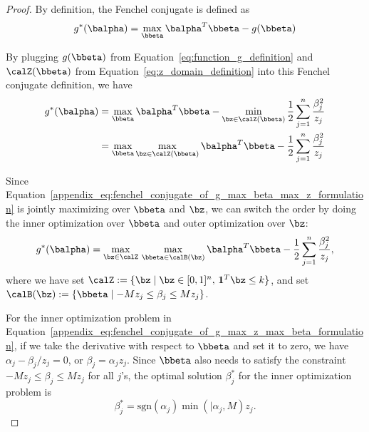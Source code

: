 \begin{proof}

    By definition, the Fenchel conjugate is defined as
    \begin{equation}
        \label{appendix_def:fenchel_conjugate_of_g}
        g^*(\balpha) = \max_{\bbeta} \balpha^T \bbeta - g(\bbeta)
    \end{equation}

    By plugging $g(\bbeta)$ from Equation~\eqref{eq:function_g_definition} and $\calZ(\bbeta)$ from Equation~\eqref{eq:z_domain_definition} into this Fenchel conjugate definition, we have
    \begin{align}
        \label{appendix_eq:fenchel_conjugate_of_g_max_beta_max_z_formulation}
            g^*(\balpha) &= \max_{\bbeta} \balpha^T \bbeta - \min_{\bz \in \calZ(\bbeta)} \frac{1}{2} \sum_{j=1}^n \frac{\beta_j^2}{z_j} \nonumber \\
            &= \max_{\bbeta} \max_{\bz \in \calZ(\bbeta)} \balpha^T \bbeta -  \frac{1}{2} \sum_{j=1}^n \frac{\beta_j^2}{z_j}
    \end{align}

    Since Equation~\eqref{appendix_eq:fenchel_conjugate_of_g_max_beta_max_z_formulation} is jointly maximizing over $\bbeta$ and $\bz$, we can switch the order by doing the inner optimization over $\bbeta$ and outer optimization over $\bz$:
    \begin{align}
        \label{appendix_eq:fenchel_conjugate_of_g_max_z_max_beta_formulation}
        g^*(\balpha) = \max_{\bz \in \calZ} \, \max_{\bbeta \in \calB(\bz)} \balpha^T \bbeta - \frac{1}{2} \sum_{j=1}^n \frac{\beta_j^2}{z_j},
    \end{align}
    where we have set $\calZ := \{\bz \mid \bz \in [0,1]^n, \, \mathbf{1}^T \bz \leq k\}$, and set $\calB(\bz) := \{\bbeta \mid - M z_j \leq \beta_j \leq M z_j\}$.

    For the inner optimization problem in Equation~\eqref{appendix_eq:fenchel_conjugate_of_g_max_z_max_beta_formulation}, if we take the derivative with respect to $\bbeta$ and set it to zero, we have $\alpha_j - \beta_j / z_j = 0$, or $\beta_j = \alpha_j z_j$.
    Since $\bbeta$ also needs to satisfy the constraint $ - M z_j \leq \beta_j \leq M z_j$ for all $j$'s, the optimal solution $\beta_j^*$ for the inner optimization problem is 
    \begin{equation}
        \label{appendix_eq:solution_for_beta_in_terms_of_fenchel_dual_alpha}
        \beta_j^* = \text{sgn}(\alpha_j) \min(\vert{\alpha_j}, M) z_j.
    \end{equation}


\end{proof}
